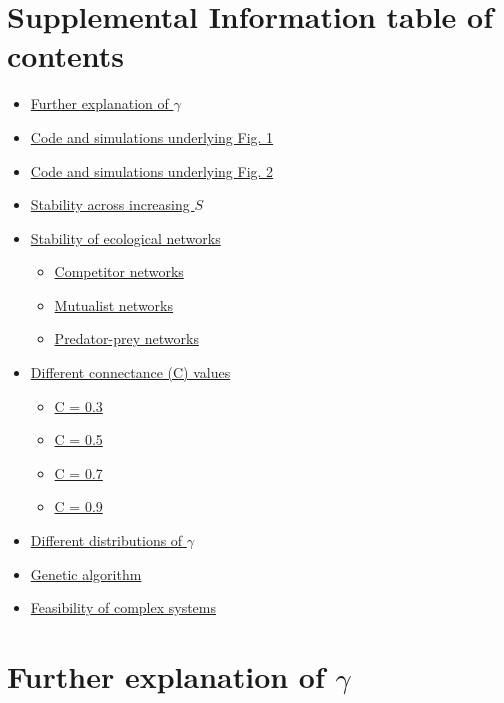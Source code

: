 \documentclass[]{article}
\providecommand{\tightlist}{%
  \setlength{\itemsep}{0pt}\setlength{\parskip}{0pt}}
\begin{document}
\section{Supplemental Information table of
contents}\label{supplemental-information-table-of-contents}

\begin{itemize}
\tightlist
\item
  \protect\hyperlink{moregamma}{Further explanation of \(\gamma\)}
\item
  \protect\hyperlink{Fig1}{Code and simulations underlying Fig. 1}
\item
  \protect\hyperlink{Fig2}{Code and simulations underlying Fig. 2}
\item
  \protect\hyperlink{IncrS}{Stability across increasing \(S\)}
\item
  \protect\hyperlink{ecological}{Stability of ecological networks}

  \begin{itemize}
  \tightlist
  \item
    \protect\hyperlink{competition}{Competitor networks}
  \item
    \protect\hyperlink{mutualism}{Mutualist networks}
  \item
    \protect\hyperlink{pred-prey}{Predator-prey networks}
  \end{itemize}
\item
  \protect\hyperlink{connectance}{Different connectance (C) values}

  \begin{itemize}
  \tightlist
  \item
    \protect\hyperlink{connect3}{C = 0.3}
  \item
    \protect\hyperlink{connect5}{C = 0.5}
  \item
    \protect\hyperlink{connect7}{C = 0.7}
  \item
    \protect\hyperlink{connect9}{C = 0.9}
  \end{itemize}
\item
  \protect\hyperlink{gam_dist}{Different distributions of \(\gamma\)}
\item
  \protect\hyperlink{ga}{Genetic algorithm}
\item
  \protect\hyperlink{Feasibility}{Feasibility of complex systems}
\end{itemize}

\hypertarget{moregamma}{\section{\texorpdfstring{Further explanation of
\(\gamma\)}{Further explanation of \textbackslash{}gamma}}\label{moregamma}}
\end{document}
